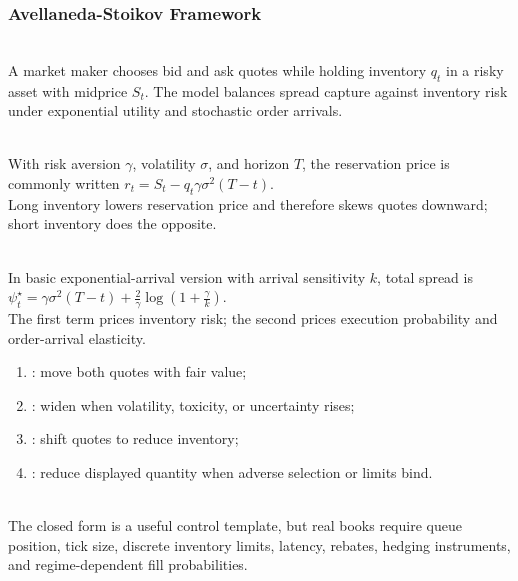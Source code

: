 \subsubsection{Avellaneda-Stoikov Framework}

\begin{model} \\
A market maker chooses bid and ask quotes while holding inventory $q_t$ in a risky asset with midprice $S_t$. The model balances spread capture against inventory risk under exponential utility and stochastic order arrivals.
\end{model}

\begin{model} \\
With risk aversion $\gamma$, volatility $\sigma$, and horizon $T$, the reservation price is commonly written $r_t=S_t-q_t\gamma\sigma^2(T-t)$.\\
Long inventory lowers reservation price and therefore skews quotes downward; short inventory does the opposite.
\end{model}

\begin{model} \\
In basic exponential-arrival version with arrival sensitivity $k$, total spread is $\psi_t^\star=\gamma\sigma^2(T-t)+\frac{2}{\gamma}\log\left(1+\frac{\gamma}{k}\right)$.\\
The first term prices inventory risk; the second prices execution probability and order-arrival elasticity.
\end{model}

\begin{taxonomy} 
\begin{enumerate}[label=\roman*.]
\setlength{\itemsep}{0pt}
\item {}: move both quotes with fair value;
\item {}: widen when volatility, toxicity, or uncertainty rises;
\item {}: shift quotes to reduce inventory;
\item {}: reduce displayed quantity when adverse selection or limits bind.
\end{enumerate}
\end{taxonomy}

\begin{caveat} \\
The closed form is a useful control template, but real books require queue position, tick size, discrete inventory limits, latency, rebates, hedging instruments, and regime-dependent fill probabilities.
\end{caveat}
